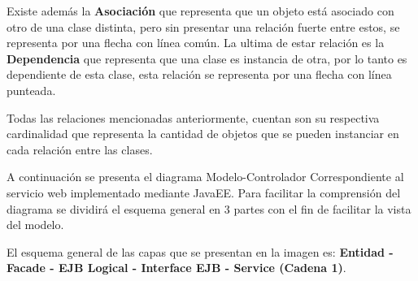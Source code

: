 \documentclass{memoria}
\begin{document}
Existe además la \textbf{Asociación} que representa que un objeto está asociado con otro de una clase distinta, pero sin presentar una relación fuerte entre estos, se representa por una flecha con línea común. La ultima de estar relación es la \textbf{Dependencia} que representa que una clase es instancia de otra, por lo tanto es dependiente de esta clase, esta relación se representa por una flecha con línea punteada. 

Todas las relaciones mencionadas anteriormente, cuentan son su respectiva cardinalidad que representa la cantidad de objetos que se pueden instanciar en cada relación entre las clases.





A continuación se presenta el diagrama Modelo-Controlador Correspondiente al servicio web implementado mediante JavaEE. Para facilitar la comprensión del diagrama se dividirá el esquema general en 3 partes con el fin de facilitar la vista del modelo. 


El esquema general de las capas que se presentan en la imagen es: \textbf{Entidad - Facade - EJB Logical - Interface EJB - Service (Cadena 1)}.
\end{document}
